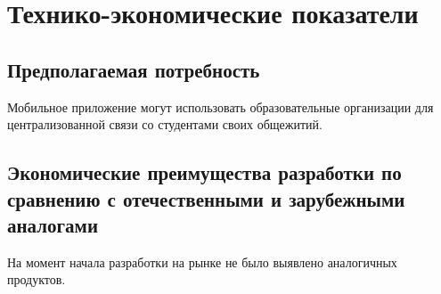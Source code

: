 \section{Технико-экономические показатели}

\subsection{Предполагаемая потребность}

Мобильное приложение могут использовать образовательные организации для централизованной связи со студентами своих
общежитий.

\subsection{Экономические преимущества разработки по сравнению с отечественными и зарубежными аналогами}

На момент начала разработки на рынке не было выявлено аналогичных продуктов.